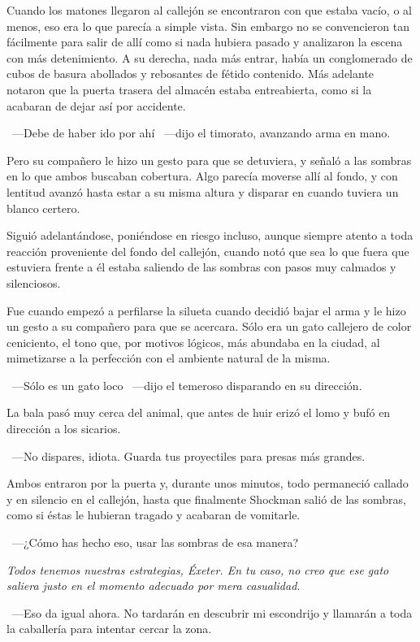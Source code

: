 Cuando los matones llegaron al callejón se encontraron con que estaba vacío, o al menos, eso era lo que parecía a simple vista. Sin embargo no se convencieron tan fácilmente para salir de allí como si nada hubiera pasado y analizaron la escena con más detenimiento. A su derecha, nada más entrar, había un conglomerado de cubos de basura abollados y rebosantes de fétido contenido. Más adelante notaron que la puerta trasera del almacén estaba entreabierta, como si la acabaran de dejar así por accidente.

~---Debe de haber ido por ahí ~---dijo el timorato, avanzando arma en mano.

Pero su compañero le hizo un gesto para que se detuviera, y señaló a las sombras en lo que ambos buscaban cobertura. Algo parecía moverse allí al fondo, y con lentitud avanzó hasta estar a su misma altura y disparar en cuando tuviera un blanco certero.

Siguió adelantándose, poniéndose en riesgo incluso, aunque siempre atento a toda reacción proveniente del fondo del callejón, cuando notó que sea lo que fuera que estuviera frente a él estaba saliendo de las sombras con pasos muy calmados y silenciosos.

Fue cuando empezó a perfilarse la silueta cuando decidió bajar el arma y le hizo un gesto a su compañero para que se acercara. Sólo era un gato callejero de color ceniciento, el tono que, por motivos lógicos, más abundaba en la ciudad, al mimetizarse a la perfección con el ambiente natural de la misma.

~---Sólo es un gato loco ~---dijo el temeroso disparando en su dirección.

La bala pasó muy cerca del animal, que antes de huir erizó el lomo y bufó en dirección a los sicarios.

~---No dispares, idiota. Guarda tus proyectiles para presas más grandes.

Ambos entraron por la puerta y, durante unos minutos, todo permaneció callado y en silencio en el callejón, hasta que finalmente Shockman salió de las sombras, como si éstas le hubieran tragado y acabaran de vomitarle.

~---¿Cómo has hecho eso, usar las sombras de esa manera?

\emph{Todos tenemos nuestras estrategias, Éxeter. En tu caso, no creo que ese gato saliera justo en el momento adecuado por mera casualidad.}

~---Eso da igual ahora. No tardarán en descubrir mi escondrijo y llamarán a toda la caballería para intentar cercar la zona.

